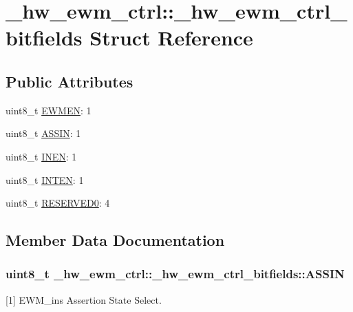 \hypertarget{struct__hw__ewm__ctrl_1_1__hw__ewm__ctrl__bitfields}{}\section{\+\_\+hw\+\_\+ewm\+\_\+ctrl\+:\+:\+\_\+hw\+\_\+ewm\+\_\+ctrl\+\_\+bitfields Struct Reference}
\label{struct__hw__ewm__ctrl_1_1__hw__ewm__ctrl__bitfields}
\subsection*{Public Attributes}
\begin{DoxyCompactItemize}
\item 
uint8\+\_\+t \hyperlink{struct__hw__ewm__ctrl_1_1__hw__ewm__ctrl__bitfields_a244630b34fd1eabc8a55d1f6f01ba431}{E\+W\+M\+EN}\+: 1
\item 
uint8\+\_\+t \hyperlink{struct__hw__ewm__ctrl_1_1__hw__ewm__ctrl__bitfields_ab7687c8d0b8c64970b3c7749d3f26cfd}{A\+S\+S\+IN}\+: 1
\item 
uint8\+\_\+t \hyperlink{struct__hw__ewm__ctrl_1_1__hw__ewm__ctrl__bitfields_a83bc919e1c92e70ad14f2aea666b223f}{I\+N\+EN}\+: 1
\item 
uint8\+\_\+t \hyperlink{struct__hw__ewm__ctrl_1_1__hw__ewm__ctrl__bitfields_af0478b394795eb670c2b0916be68ef41}{I\+N\+T\+EN}\+: 1
\item 
uint8\+\_\+t \hyperlink{struct__hw__ewm__ctrl_1_1__hw__ewm__ctrl__bitfields_adfb09e8eeb56ae347b0214413d9d25a8}{R\+E\+S\+E\+R\+V\+E\+D0}\+: 4
\end{DoxyCompactItemize}


\subsection{Member Data Documentation}
\subsubsection[{\texorpdfstring{A\+S\+S\+IN}{ASSIN}}]{\setlength{\rightskip}{0pt plus 5cm}uint8\+\_\+t \+\_\+hw\+\_\+ewm\+\_\+ctrl\+::\+\_\+hw\+\_\+ewm\+\_\+ctrl\+\_\+bitfields\+::\+A\+S\+S\+IN}\hypertarget{struct__hw__ewm__ctrl_1_1__hw__ewm__ctrl__bitfields_ab7687c8d0b8c64970b3c7749d3f26cfd}{}\label{struct__hw__ewm__ctrl_1_1__hw__ewm__ctrl__bitfields_ab7687c8d0b8c64970b3c7749d3f26cfd}
\mbox{[}1\mbox{]} E\+W\+M\+\_\+in\textquotesingle{}s Assertion State Select. 
